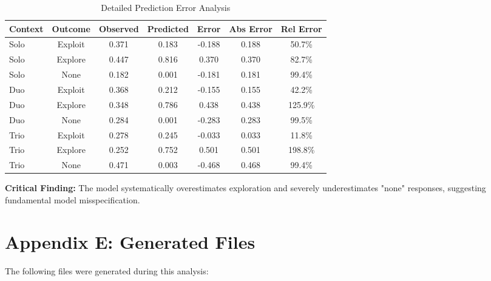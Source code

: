 \documentclass[11pt,a4paper]{article}
\begin{document}
\begin{table}[H]
\centering
\caption{Detailed Prediction Error Analysis}
\begin{tabular}{lcccccc}
\toprule
\textbf{Context} & \textbf{Outcome} & \textbf{Observed} & \textbf{Predicted} & \textbf{Error} & \textbf{Abs Error} & \textbf{Rel Error} \\
\midrule
Solo & Exploit & 0.371 & 0.183 & -0.188 & 0.188 & 50.7\% \\
Solo & Explore & 0.447 & 0.816 & 0.370 & 0.370 & 82.7\% \\
Solo & None & 0.182 & 0.001 & -0.181 & 0.181 & 99.4\% \\
\midrule
Duo & Exploit & 0.368 & 0.212 & -0.155 & 0.155 & 42.2\% \\
Duo & Explore & 0.348 & 0.786 & 0.438 & 0.438 & 125.9\% \\
Duo & None & 0.284 & 0.001 & -0.283 & 0.283 & 99.5\% \\
\midrule
Trio & Exploit & 0.278 & 0.245 & -0.033 & 0.033 & 11.8\% \\
Trio & Explore & 0.252 & 0.752 & 0.501 & 0.501 & 198.8\% \\
Trio & None & 0.471 & 0.003 & -0.468 & 0.468 & 99.4\% \\
\bottomrule
\end{tabular}
\end{table}

\textbf{Critical Finding:} The model systematically overestimates exploration and severely underestimates "none" responses, suggesting fundamental model misspecification.

\section{Appendix E: Generated Files}

The following files were generated during this analysis:
\end{document}
